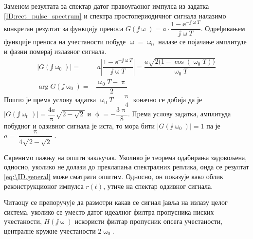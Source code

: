 Заменом резултата за спектар датог правоугаоног импулса из задатка \ref{ID:rect_pulse_spectrum}
и спектра простопериодичног сигнала налазимо конкретан резултат за функцију преноса 
${G(\jj\upomega) = a \cdot \dfrac{1 - \ee^{-\jj\upomega T} }{\jj\upomega T}}$. Одређивањем функције преноса на учестаности
побуде $\upomega = \upomega_0$ налазе се појачање амплитуде и фазни померај излазног сигнала.  
\begin{align}
    |G(\jj\upomega_0)| = &\ a \left| \dfrac{1 - \ee^{-\jj\upomega T} }{\jj\upomega T} \right| = 
    \dfrac{ a\sqrt{2\bigl(1 - \cos(\upomega_0 T)\bigr)} }{\upomega_0 T} \\
    \arg G(\jj\upomega_0) = & \dfrac{\upomega_0 T - \uppi}{2} 
\end{align}
Пошто је према услову задатка $\upomega_0 T = \dfrac{\uppi}{4}$ коначно се добија да је 
$|G(\jj\upomega_0)| = \dfrac{4a}{\uppi} \sqrt{2 - \sqrt {2}}$ и $\upphi = -\dfrac{3\uppi}{8}$. Према услову задатка, 
амплитуда побудног и одзивног сигнала је иста, то мора бити $|G(\jj\upomega_0)| = 1$ па је 
$a = \dfrac{\uppi} { 4 \sqrt{2 - \sqrt {2}} }$.

Скренимо пажњу на општи закључак. Уколико је теорема одабирања задовољена, односно, уколико не долази до преклапања 
спектралних реплика, онда се резултат \ref{eq:\ID.general} може сматрати општим. Односно, он показује како облик 
реконструкционог импулса $r(t)$, утиче на спектар одзивног сигнала. 

Читаоцу се препоручује
да размотри какав се сигнал јавља на излазу целог система, уколико се уместо датог идеалног филтра 
пропусника ниских учестаности, $H(\jj\upomega)$ искористи филтар пропусник опсега учестаности, централне кружне учестаности $2 \upomega_0$. 
